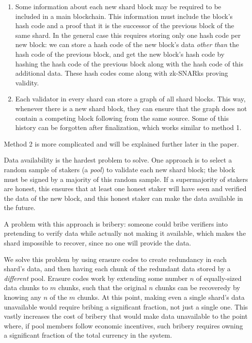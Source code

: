 \documentclass{article}
\begin{document}
\begin{enumerate}
  \item Some information about each new shard block may be required to be included in a main blockchain.  This information must include the block's hash code and a proof that it is the successor of the previous block of the same shard.  In the general case this requires storing only one hash code per new block: we can store a hash code of the new block's data \emph{other than} the hash code of the previous block, and get the new block's hash code by hashing the hash code of the previous block along with the hash code of this additional data.  These hash codes come along with zk-SNARks proving validity.
  \item Each validator in every shard can store a graph of all shard blocks.  This way, whenever there is a new shard block, they can ensure that the graph does not contain a competing block following from the same source.  Some of this history can be forgotten after finalization, which works similar to method 1.
\end{enumerate}

Method 2 is more complicated and will be explained further later in the paper.

Data availability is the hardest problem to solve.  One approach is to select a random sample of stakers (a \emph{pool}) to validate each new shard block; the block must be signed by a majority of this random sample.  If a supermajority of stakers are honest, this ensures that at least one honest staker will have seen and verified the data of the new block, and this honest staker can make the data available in the future.

A problem with this approach is bribery: someone could bribe verifiers into pretending to verify data while actually not making it available, which makes the shard impossible to recover, since no one will provide the data.

We solve this problem by using erasure codes to create redundancy in each shard's data, and then having each chunk of the redundant data stored by a \emph{different} pool.
Erasure codes work by extending some number $n$ of equally-sized data chunks to $m$ chunks, such that the original $n$ chunks can be recoveredy by knowing any $n$ of the $m$ chunks.
At this point, making even a single shard's data unavailable would require bribing a significant fraction, not just a single one.  This vastly increases the cost of bribery that would make data unavailable to the
point where, if pool members follow economic incentives, such bribery requires owning a significant fraction of the total currency in the system.
\end{document}
